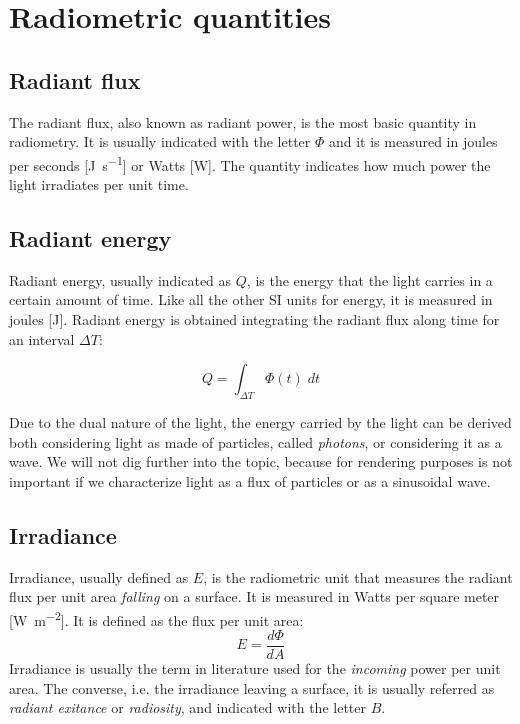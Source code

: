 \section{Radiometric quantities}

\subsection{Radiant flux}
The radiant flux, also known as radiant power, is the most basic quantity in radiometry. It is usually indicated with the letter $\Phi$ and it is measured in joules per seconds [\si{\joule\per\second}] or Watts [\si{\watt}]. The quantity indicates how much power the light irradiates per unit time. 

\subsection{Radiant energy}
Radiant energy, usually indicated as $Q$, is the energy that the light carries in a certain amount of time. Like all the other SI units for energy, it is measured in joules [\si{\joule}]. Radiant energy is obtained integrating the radiant flux along time for an interval $\Delta T$:

$$
Q = \int_{\Delta T} \Phi(t) \; dt
$$

Due to the dual nature of the light, the energy carried by the light can be derived both considering light as made of particles, called \emph{photons}, or considering it as a wave. We will not dig further into the topic, because for rendering purposes is not important if we characterize light as a flux of particles or as a sinusoidal wave.

\subsection{Irradiance}

Irradiance, usually defined as $E$, is the radiometric unit that measures the radiant flux per unit area \emph{falling} on a surface. It is measured in Watts per square meter [\si{\watt\per\square\meter}]. It is defined as the flux per unit area:
$$
E = \frac{d\Phi}{dA}
$$
Irradiance is usually the term in literature used for the \emph{incoming} power per unit area. The converse, i.e. the irradiance leaving a surface, it is usually referred as \emph{radiant exitance} or \emph{radiosity}, and indicated with the letter $B$.

